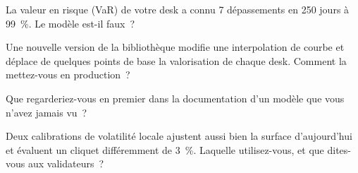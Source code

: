 \begin{interviewq}\label{iq:in:bank-quant:3}
La valeur en risque (VaR) de votre desk a connu 7 dépassements en 250 jours à 99~\%. Le modèle est-il faux~?
\end{interviewq}

\begin{interviewq}\label{iq:in:bank-quant:4}
Une nouvelle version de la bibliothèque modifie une interpolation de courbe et déplace de quelques points de base la valorisation de chaque desk. Comment
la mettez-vous en production~?
\end{interviewq}

\begin{interviewq}\label{iq:in:bank-quant:5}
Que regarderiez-vous en premier dans la documentation d'un modèle que vous n'avez jamais vu~?
\end{interviewq}

\begin{interviewq}\label{iq:in:bank-quant:6}
Deux calibrations de volatilité locale ajustent aussi bien la surface d'aujourd'hui et évaluent un cliquet différemment de 3~\%. Laquelle
utilisez-vous, et que dites-vous aux validateurs~?
\end{interviewq}
